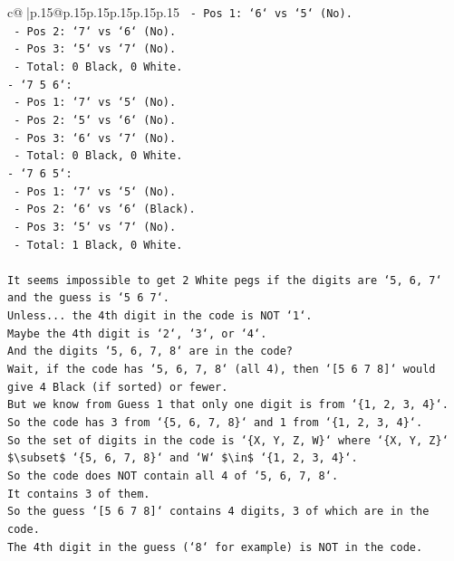 \documentclass{article}
\begin{document}
{\begin{supertabular}{c@{$\;$}|p{.15\linewidth}@{}p{.15\linewidth}p{.15\linewidth}p{.15\linewidth}p{.15\linewidth}p{.15\linewidth}}
{{{\texttt{  {-} Pos 1: `6` vs `5` (No).} \\
\texttt{  {-} Pos 2: `7` vs `6` (No).} \\
\texttt{  {-} Pos 3: `5` vs `7` (No).} \\
\texttt{  {-} Total: 0 Black, 0 White.} \\
\texttt{{-} `7 5 6`:} \\
\texttt{  {-} Pos 1: `7` vs `5` (No).} \\
\texttt{  {-} Pos 2: `5` vs `6` (No).} \\
\texttt{  {-} Pos 3: `6` vs `7` (No).} \\
\texttt{  {-} Total: 0 Black, 0 White.} \\
\texttt{{-} `7 6 5`:} \\
\texttt{  {-} Pos 1: `7` vs `5` (No).} \\
\texttt{  {-} Pos 2: `6` vs `6` (Black).} \\
\texttt{  {-} Pos 3: `5` vs `7` (No).} \\
\texttt{  {-} Total: 1 Black, 0 White.} \\
\\ 
\texttt{It seems impossible to get 2 White pegs if the digits are `5, 6, 7` and the guess is `5 6 7`.} \\
\texttt{Unless... the 4th digit in the code is NOT `1`.} \\
\texttt{Maybe the 4th digit is `2`, `3`, or `4`.} \\
\texttt{And the digits `5, 6, 7, 8` are in the code?} \\
\texttt{Wait, if the code has `5, 6, 7, 8` (all 4), then `{[}5 6 7 8{]}` would give 4 Black (if sorted) or fewer.} \\
\texttt{But we know from Guess 1 that only one digit is from `\{1, 2, 3, 4\}`.} \\
\texttt{So the code has 3 from `\{5, 6, 7, 8\}` and 1 from `\{1, 2, 3, 4\}`.} \\
\texttt{So the set of digits in the code is `\{X, Y, Z, W\}` where `\{X, Y, Z\}` \$\textbackslash{}subset\$ `\{5, 6, 7, 8\}` and `W` \$\textbackslash{}in\$ `\{1, 2, 3, 4\}`.} \\
\texttt{So the code does NOT contain all 4 of `5, 6, 7, 8`.} \\
\texttt{It contains 3 of them.} \\
\texttt{So the guess `{[}5 6 7 8{]}` contains 4 digits, 3 of which are in the code.} \\
\texttt{The 4th digit in the guess (`8` for example) is NOT in the code.} \\
}}}
\end{supertabular}}
\end{document}
